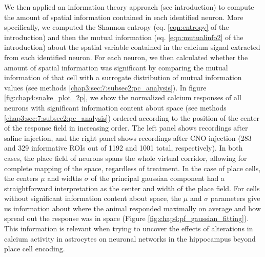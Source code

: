 We then applied an information theory approach (see introduction) to compute the amount of spatial information contained in each identified neuron. 
More specifically, we computed the Shannon entropy (eq. \ref{eqn:entropy} of the introduction) and then the mutual information (eq. \ref{eqn:mutualinfo2} of the introduction) about the spatial variable contained in the calcium signal extracted from each identified neuron. 
For each neuron, we then calculated whether the amount of spatial information was significant by comparing the mutual information of that cell with a surrogate distribution of mutual information values (see methods \ref{chap3:sec:7:subsec2:pc_analysis}).
In figure \ref{fig:chap4:snake_plot_2p}, we show the normalized calcium responses of all neurons with significant information content about space (see methods \ref{chap3:sec:7:subsec2:pc_analysis}) ordered according to the position of the center of the response field in increasing order.
The left panel shows recordings after saline injection, and the right panel shows recordings after CNO injection (283 and 329 informative  ROIs out  of  1192 and 1001 total, respectively). 
In both cases, the place field of neurons spans the whole virtual corridor, allowing for complete mapping of the space, regardless of treatment. 
In the case of place cells, the centers $\mu$ and widths $\sigma$ of the principal gaussian component had a straightforward interpretation as the center and width of the place field. 
For cells without significant information content about space, the $\mu$ and $\sigma$ parameters give us information about where the animal responded maximally on average and how spread out the response was in space (Figure \ref{fig:chap4:pf_gaussian_fitting}).
This information is relevant when trying to uncover the effects of alterations in calcium activity in astrocytes on neuronal networks in the hippocampus beyond place cell encoding. 
